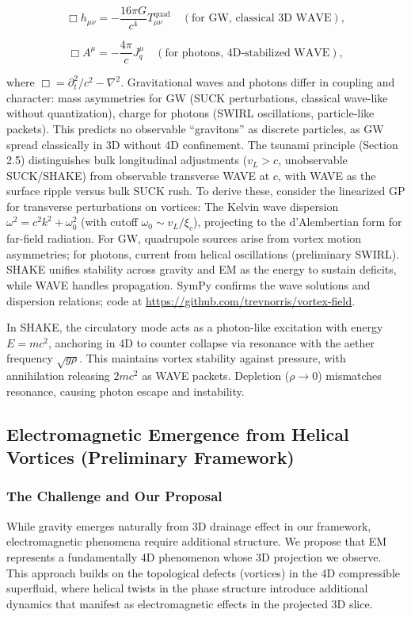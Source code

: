 \begin{equation}
\Box h_{\mu\nu} = -\frac{16\pi G}{c^4} T_{\mu\nu}^{\text{quad}} \quad (\text{for GW, classical 3D WAVE}),
\end{equation}

\begin{equation}
\Box A^\mu = -\frac{4\pi}{c} J_q^\mu \quad (\text{for photons, 4D-stabilized WAVE}),
\end{equation}

where $\Box = \partial_t^2 / c^2 - \nabla^2$. Gravitational waves and photons differ in coupling and character: mass asymmetries for GW (SUCK perturbations, classical wave-like without quantization), charge for photons (SWIRL oscillations, particle-like packets). This predicts no observable ``gravitons'' as discrete particles, as GW spread classically in 3D without 4D confinement. The tsunami principle (Section 2.5) distinguishes bulk longitudinal adjustments ($v_L > c$, unobservable SUCK/SHAKE) from observable transverse WAVE at $c$, with WAVE as the surface ripple versus bulk SUCK rush. To derive these, consider the linearized GP for transverse perturbations on vortices: The Kelvin wave dispersion $\omega^2 = c^2 k^2 + \omega_0^2$ (with cutoff $\omega_0 \sim v_L / \xi_c$), projecting to the d'Alembertian form for far-field radiation. For GW, quadrupole sources arise from vortex motion asymmetries; for photons, current from helical oscillations (preliminary SWIRL). SHAKE unifies stability across gravity and EM as the energy to sustain deficits, while WAVE handles propagation. SymPy confirms the wave solutions and dispersion relations; code at \url{https://github.com/trevnorris/vortex-field}.

In SHAKE, the circulatory mode acts as a photon-like excitation with energy $E = mc^2$, anchoring in 4D to counter collapse via resonance with the aether frequency $\sqrt{g \rho}$. This maintains vortex stability against pressure, with annihilation releasing $2mc^2$ as WAVE packets. Depletion ($\rho \to 0$) mismatches resonance, causing photon escape and instability.

\subsection{Electromagnetic Emergence from Helical Vortices (Preliminary Framework)}

\subsubsection{The Challenge and Our Proposal}
While gravity emerges naturally from 3D drainage effect in our framework, electromagnetic phenomena require additional structure. We propose that EM represents a fundamentally 4D phenomenon whose 3D projection we observe. This approach builds on the topological defects (vortices) in the 4D compressible superfluid, where helical twists in the phase structure introduce additional dynamics that manifest as electromagnetic effects in the projected 3D slice.

